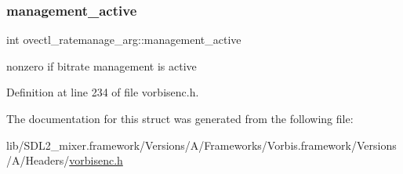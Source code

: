\mbox{\label{structovectl__ratemanage__arg_ad792d1b89a5d07f0f0e90509df4bc606}} 
\subsubsection{\texorpdfstring{management\_active}{management\_active}}
{\footnotesize\ttfamily int ovectl\+\_\+ratemanage\+\_\+arg\+::management\+\_\+active}

nonzero if bitrate management is active 

Definition at line 234 of file vorbisenc.\+h.



The documentation for this struct was generated from the following file\+:\begin{DoxyCompactItemize}
\item 
lib/\+S\+D\+L2\+\_\+mixer.\+framework/\+Versions/\+A/\+Frameworks/\+Vorbis.\+framework/\+Versions/\+A/\+Headers/\mbox{\hyperlink{vorbisenc_8h}{vorbisenc.\+h}}\end{DoxyCompactItemize}

